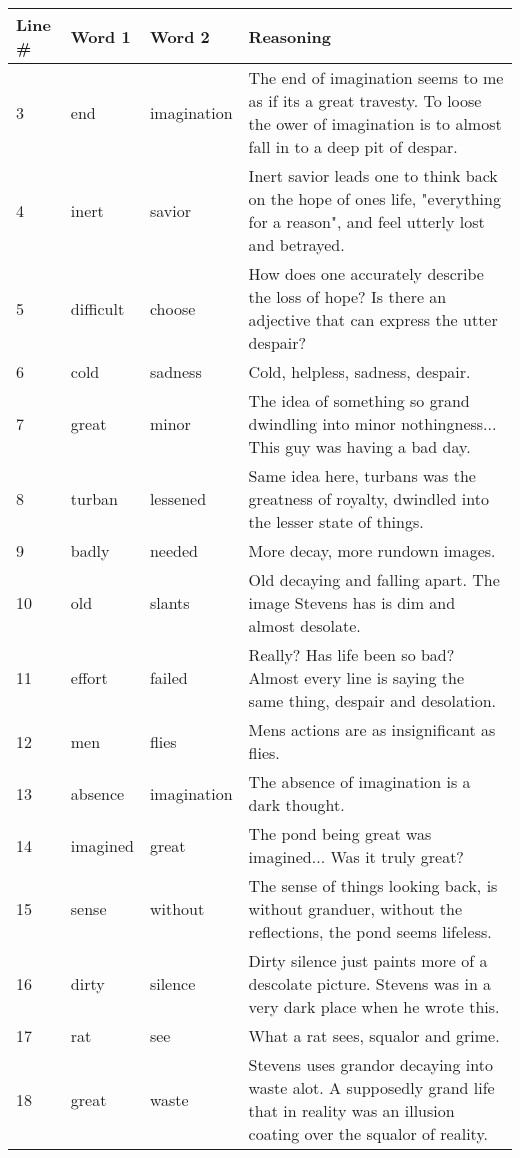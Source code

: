 \documentclass[a4paper,12pt]{article}
\begin{document}
\begin{center}
	\begin{tabular}{|l|l|l|p{2.5in}|}
	\hline
	Line \#& Word 1 & Word 2 & Reasoning \\ \hline
	3&end&imagination&The end of imagination seems to me as if its a great travesty.  To loose the ower of imagination is to almost fall in to a deep pit of despar.\\ \hline
	4&inert&savior&Inert savior leads one to think back on the hope of ones life, "everything for a reason", and feel utterly lost and betrayed.\\ \hline
	5&difficult&choose&How does one accurately describe the loss of hope?  Is there an adjective that can express the utter despair?\\ \hline
	6&cold&sadness&Cold, helpless, sadness, despair.\\ \hline
	7&great&minor&The idea of something so grand dwindling into minor nothingness...  This guy was having a bad day.\\ \hline
	8&turban&lessened&Same idea here, turbans was the greatness of royalty, dwindled into the lesser state of things.\\ \hline
	9&badly&needed&More decay, more rundown images.\\ \hline
	10&old&slants&Old decaying and falling apart.  The image Stevens has is dim and almost desolate.\\ \hline
	11&effort&failed&Really?  Has life been so bad?  Almost every line is saying the same thing, despair and desolation.\\ \hline
	12&men&flies&Mens actions are as insignificant as flies.\\ \hline
	13&absence&imagination&The absence of imagination is a dark thought.\\ \hline
	14&imagined&great&The pond being great was imagined...  Was it truly great?\\ \hline
	15&sense&without&The sense of things looking back, is without granduer, without the reflections, the pond seems lifeless.\\ \hline
	16&dirty&silence&Dirty silence just paints more of a descolate picture.  Stevens was in a very dark place when he wrote this.\\ \hline
	17&rat&see&What a rat sees, squalor and grime.\\ \hline
	18&great&waste&Stevens uses grandor decaying into waste alot.  A supposedly grand life that in reality was an illusion coating over the squalor of reality.\\ \hline
	\end{tabular}
\end{center}
\end{document}
